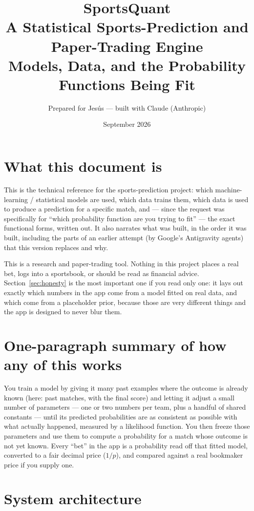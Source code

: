 \documentclass[11pt]{article}
\title{\textbf{SportsQuant}\\[4pt]\large A Statistical Sports-Prediction and Paper-Trading Engine\\[2pt]
\normalsize Models, Data, and the Probability Functions Being Fit}
\author{Prepared for Jes\'us --- built with Claude (Anthropic)}
\date{September 2026}
\begin{document}
\maketitle
\tableofcontents

\section{What this document is}
This is the technical reference for the sports-prediction project: which machine-learning /
statistical models are used, which data trains them, which data is used to produce a prediction
for a specific match, and --- since the request was specifically for ``which probability function
are you trying to fit'' --- the exact functional forms, written out. It also narrates what was
built, in the order it was built, including the parts of an earlier attempt (by Google's
Antigravity agents) that this version replaces and why.

This is a research and paper-trading tool. Nothing in this project places a real bet, logs into a
sportsbook, or should be read as financial advice. Section~\ref{sec:honesty} is the most important
one if you read only one: it lays out exactly which numbers in the app come from a model fitted
on real data, and which come from a placeholder prior, because those are very different things
and the app is designed to never blur them.

\section{One-paragraph summary of how any of this works}
You train a model by giving it many past examples where the outcome is already known (here: past
matches, with the final score) and letting it adjust a small number of parameters --- one or two
numbers per team, plus a handful of shared constants --- until its predicted probabilities are as
consistent as possible with what actually happened, measured by a likelihood function. You then
freeze those parameters and use them to compute a probability for a match whose outcome is not yet
known. Every ``bet'' in the app is a probability read off that fitted model, converted to a fair
decimal price ($1/p$), and compared against a real bookmaker price if you supply one.

\section{System architecture}
\end{document}
